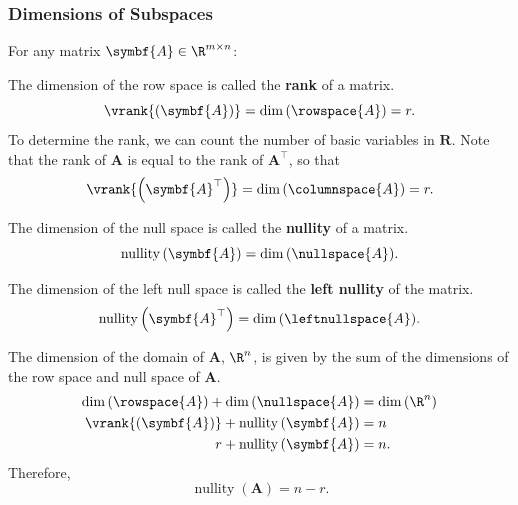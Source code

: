 \documentclass{article}
\DeclareMathOperator*{\nullity}{nullity}
\begin{document}
\subsubsection{Dimensions of Subspaces}
For any matrix \(\symbf{A} \in \R^{m \times n}\):
\begin{definition}[Rank]
    The dimension of the row space is called the \textbf{rank} of a matrix.
    \begin{equation*}
        \vrank{\left( \symbf{A} \right)} = \dim{\left( \rowspace{A} \right)} = r.
    \end{equation*}
    To determine the rank, we can count the number of basic variables in \(\symbf{R}\).
    Note that the rank of \(\symbf{A}\) is equal to the rank of \(\symbf{A}^\top\), so that
    \begin{equation*}
        \vrank{\left( \symbf{A}^\top \right)} = \dim{\left( \columnspace{A} \right)} = r.
    \end{equation*}
\end{definition}
\begin{definition}[Nullity]
    The dimension of the null space is called the \textbf{nullity} of a matrix.
    \begin{equation*}
        \nullity{\left( \symbf{A} \right)} = \dim{\left( \nullspace{A} \right)}.
    \end{equation*}
\end{definition}
\begin{definition}
    The dimension of the left null space is called the \textbf{left nullity} of the matrix.
    \begin{equation*}
        \nullity{\left( \symbf{A}^\top \right)} = \dim{\left( \leftnullspace{A} \right)}.
    \end{equation*}
\end{definition}
\begin{theorem}
    The dimension of the domain of \(\symbf{A}\), \(\R^n\), is given by
    the sum of the dimensions of the row space and null space of \(\symbf{A}\).
    \begin{align*}
        \dim{\left( \rowspace{A} \right)} + \dim{\left( \nullspace{A} \right)} & = \dim{\left( \R^n \right)} \\
        \vrank{\left( \symbf{A} \right)} + \nullity{\left( \symbf{A} \right)}  & = n                         \\
        r + \nullity{\left( \symbf{A} \right)}                                 & = n.
    \end{align*}
    Therefore,
    \begin{equation*}
        \nullity{\left( \symbf{A} \right)} = n - r.
    \end{equation*}
\end{theorem}
\end{document}
